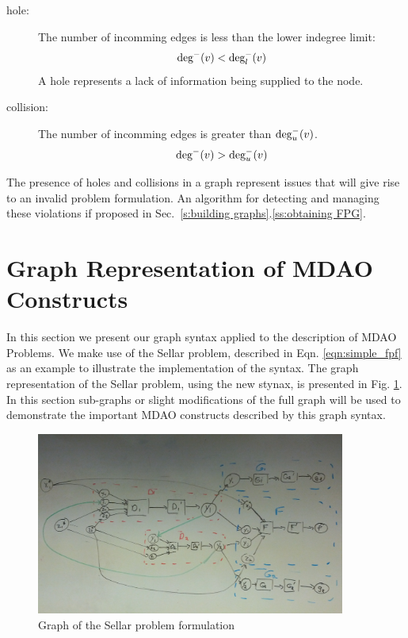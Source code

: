   \begin{description}
    \item[hole: ] The number of incomming edges is less than the lower indegree limit:
      \begin{equation} \textrm{deg}^-(v) < \textrm{deg}_l^-(v) \label{e:hole} \end{equation}
      A hole represents a lack of information being supplied to the node.
    \item[collision: ] The number of incomming edges is greater than $ \textrm{deg}_u^-(v)$. 
      \begin{equation} \textrm{deg}^-(v) > \textrm{deg}_u^-(v) \label{e:collision}\end{equation}
  \end{description} 

  The presence of holes and collisions in a graph represent issues that will give
  rise to an invalid problem formulation. An algorithm for detecting and 
  managing these violations if proposed in Sec.~\ref{s:building graphs}.\ref{ss:obtaining FPG}.

\section{Graph Representation of MDAO Constructs}
\label{s:graph representation}
In this section we present our graph syntax applied to the description of MDAO 
Problems. We make use of the Sellar problem, described in 
Eqn. \ref{eqn:simple_fpf} as an example to illustrate the implementation of the syntax. 
The graph representation of the Sellar problem, using the new stynax, is 
presented in Fig. \ref{f:sellar_graph_full}. In this section sub-graphs or 
slight modifications of the full graph will be used to demonstrate the 
important MDAO constructs described by this graph syntax.

\begin{figure}[htb!]
    \begin{center}
    \includegraphics[width=4in]{images/sellar_graph_full}
    \end{center}
    \vspace{-10pt}
\caption{Graph of the Sellar problem formulation}
\label{f:sellar_graph_full}
\end{figure}

